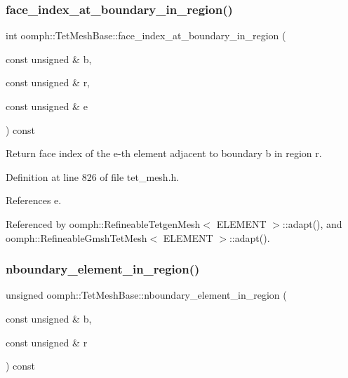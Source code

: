 \mbox{\label{classoomph_1_1TetMeshBase_a1efd6c45576e53e0f8c0ccc9c388800c}} 
\subsubsection{\texorpdfstring{face\+\_\+index\+\_\+at\+\_\+boundary\+\_\+in\+\_\+region()}{face\_index\_at\_boundary\_in\_region()}}
{\footnotesize\ttfamily int oomph\+::\+Tet\+Mesh\+Base\+::face\+\_\+index\+\_\+at\+\_\+boundary\+\_\+in\+\_\+region (\begin{DoxyParamCaption}\item[{const unsigned \&}]{b,  }\item[{const unsigned \&}]{r,  }\item[{const unsigned \&}]{e }\end{DoxyParamCaption}) const\hspace{0.3cm}{\ttfamily [inline]}}



Return face index of the e-\/th element adjacent to boundary b in region r. 



Definition at line 826 of file tet\+\_\+mesh.\+h.



References e.



Referenced by oomph\+::\+Refineable\+Tetgen\+Mesh$<$ E\+L\+E\+M\+E\+N\+T $>$\+::adapt(), and oomph\+::\+Refineable\+Gmsh\+Tet\+Mesh$<$ E\+L\+E\+M\+E\+N\+T $>$\+::adapt().

\mbox{\label{classoomph_1_1TetMeshBase_a5aa803726d0e3a08ba5673452f919978}} 
\subsubsection{\texorpdfstring{nboundary\+\_\+element\+\_\+in\+\_\+region()}{nboundary\_element\_in\_region()}}
{\footnotesize\ttfamily unsigned oomph\+::\+Tet\+Mesh\+Base\+::nboundary\+\_\+element\+\_\+in\+\_\+region (\begin{DoxyParamCaption}\item[{const unsigned \&}]{b,  }\item[{const unsigned \&}]{r }\end{DoxyParamCaption}) const\hspace{0.3cm}{\ttfamily [inline]}}



